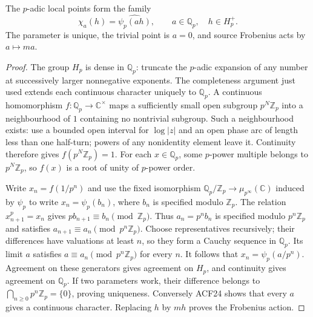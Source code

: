 \begin{proposition}
The $p$-adic local points form the family
\begin{equation}\tag{ACF25}
 \chi_a(h)=\widehat{\psi_p(ah)},\qquad a\in\mathbb Q_p,
 \quad h\in H_p^+.
\end{equation}
The parameter is unique, the trivial point is $a=0$, and source
Frobenius acts by $a\mapsto ma$.
\end{proposition}
\begin{proof}
The group $H_p$ is dense in $\mathbb Q_p$: truncate the $p$-adic
expansion of any number at successively larger nonnegative exponents.
The completeness argument just used extends each continuous character
uniquely to $\mathbb Q_p$. A continuous homomorphism
$f:\mathbb Q_p\to\mathbb C^\times$ maps a sufficiently small open
subgroup $p^N\mathbb Z_p$ into a neighbourhood of $1$ containing no
nontrivial subgroup. Such a neighbourhood exists: use a bounded open
interval for $\log|z|$ and an open phase arc of length less than one
half-turn; powers of any nonidentity element leave it. Continuity
therefore gives $f(p^N\mathbb Z_p)=1$. For each $x\in\mathbb Q_p$,
some $p$-power multiple belongs to $p^N\mathbb Z_p$, so $f(x)$ is a
root of unity of $p$-power order.

Write $x_n=f(1/p^n)$ and use the fixed isomorphism
$\mathbb Q_p/\mathbb Z_p\to\mu_{p^\infty}(\mathbb C)$ induced by
$\psi_p$ to write $x_n=\psi_p(b_n)$, where $b_n$ is specified modulo
$\mathbb Z_p$. The relation $x_{n+1}^p=x_n$ gives
$p b_{n+1}\equiv b_n\pmod{\mathbb Z_p}$.
Thus $a_n=p^n b_n$ is specified modulo $p^n\mathbb Z_p$ and satisfies
$a_{n+1}\equiv a_n\pmod{p^n\mathbb Z_p}$.
Choose representatives recursively; their differences have valuations
at least $n$, so they form a Cauchy sequence in $\mathbb Q_p$. Its
limit $a$ satisfies $a\equiv a_n\pmod{p^n\mathbb Z_p}$ for every $n$.
It follows that $x_n=\psi_p(a/p^n)$. Agreement on these generators gives
agreement on $H_p$, and continuity gives agreement on $\mathbb Q_p$.
If two parameters work, their difference belongs to
$\bigcap_{n\ge0}p^n\mathbb Z_p=\{0\}$, proving uniqueness.
Conversely ACF24 shows that every $a$ gives a continuous character.
Replacing $h$ by $mh$ proves the Frobenius action.
\end{proof}

